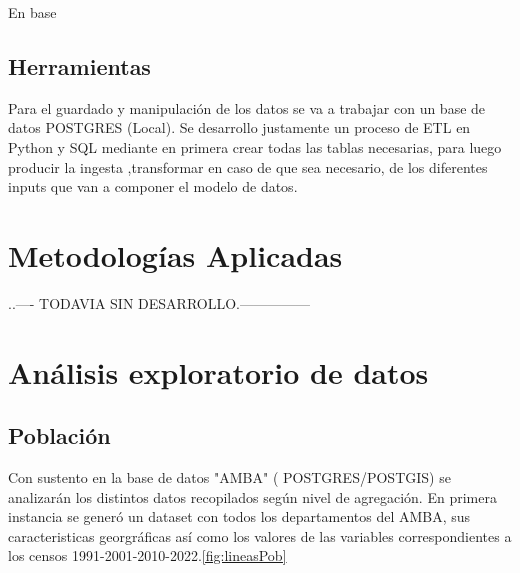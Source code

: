 \documentclass{article}
\theoremstyle{mytheoremstyle}
\theoremstyle{mytheoremstyle}
\theoremstyle{myproblemstyle}
\begin{document}
En base

\subsection{Herramientas }
Para el guardado y manipulación de los datos se va a trabajar con un base de datos POSTGRES (Local). 
Se desarrollo justamente un proceso de ETL en Python y SQL mediante en primera crear todas las tablas necesarias, 
para luego producir la ingesta ,transformar en caso de que sea necesario, de los diferentes inputs que van a componer el modelo de datos.	




\section{Metodologías Aplicadas}

..---- TODAVIA SIN DESARROLLO.---------------


\section{ Análisis exploratorio de datos}
\subsection{Población}

Con sustento en la base de datos "AMBA" ( POSTGRES/POSTGIS) se analizarán los distintos datos recopilados según nivel de agregación.
En primera instancia se  generó un dataset con todos los departamentos del AMBA, sus caracteristicas georgráficas así como los valores
de las variables correspondientes a los censos 1991-2001-2010-2022.\ref{fig:lineasPob}
 
\end{document}
